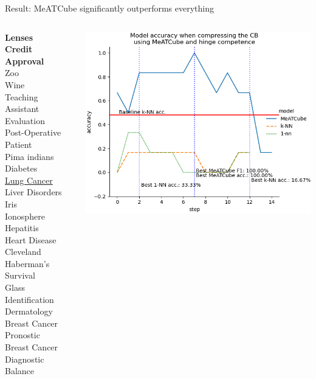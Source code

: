 \documentclass[]{beamer}
\begin{document}
\begin{frame}{Result: MeATCube significantly outperforms everything}
    \begin{columns}
        \begin{column}{.35\textwidth}
            {\smaller\smaller
            \textbf{Lenses} \\
            \textbf{Credit Approval} \\
            Zoo \\
            Wine \\
            Teaching Assistant Evaluation \\
            Post-Operative Patient \\
            Pima indians Diabetes \\
            \underline{Lung Cancer} \\
            Liver Disorders \\
            Iris \\
            Ionosphere \\
            Hepatitis \\
            Heart Disease Cleveland \\
            Haberman's Survival \\
            Glass Identification \\
            Dermatology \\
            Breast Cancer Pronostic \\
            Breast Cancer Diagnostic \\
            Balance\\
            ~}
        \end{column}
        \begin{column}{.65\textwidth}
            \includegraphics[width=.8\textwidth]{../results/figs/lung+cancer.png}

\end{column}
\end{columns}
\end{frame}
\end{document}
